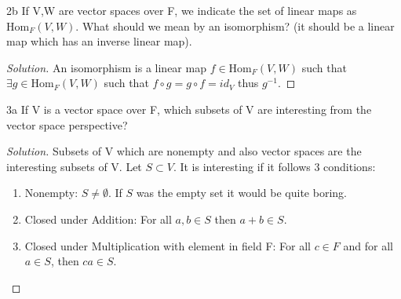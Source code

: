 \documentclass{article}
\newcommand{\Hom}[0]{\text{Hom}}
\newenvironment{solution}
  {\renewcommand\qedsymbol{$\blacksquare$}\begin{proof}[Solution]}
  {\end{proof}}
\begin{document}
\begin{PROB}{2b}\label{Problem 2b.}
	If V,W are vector spaces over F, we indicate the set of linear maps as $\Hom_F(V,W)$.  What should we mean by an isomorphism? (it should be a linear map which has an inverse linear map). 
\end{PROB}
\begin{solution}
	An isomorphism is a linear map $f \in \Hom_F(V, W)$ such that $\exists g \in \Hom_F(V, W)$ such that $f \circ g = g \circ f = id_V$ thus $g^{-1}$.  
\end{solution}

\bigskip

\begin{PROB}{3a}\label{Problem 3a.}
	If V is a vector space over F, which subsets of V are interesting from the vector space perspective? 
\end{PROB}
\begin{solution}
	Subsets of V which are nonempty and also vector spaces are the interesting subsets of V. Let $S \subset V$. It is interesting if it follows 3 conditions:

	\begin{enumerate}
		\item Nonempty: $S \neq \emptyset$. If $S$ was the empty set it would be quite boring.
		\item Closed under Addition: For all $a, b \in S$ then $a + b \in S$.
		\item Closed under Multiplication with element in field F: For all $c \in F$ and for all $a \in S$, then $ca \in S$.
	\end{enumerate}
\end{solution}
\end{document}
